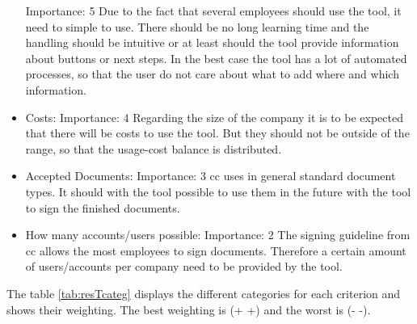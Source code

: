 \begin{itemize}
	Importance: 5 \newline
	Due to the fact that several employees should use the tool, it need to simple to use. There should be no long learning time and the handling should be intuitive or at least should the tool provide information about buttons or next steps. In the best case the tool has a lot of automated processes, so that the user do not care about what to add where and which information.
	\item Costs: \newline
	Importance: 4 \newline
	Regarding the size of the company it is to be expected that there will be costs to use the tool. But they should not be outside of the range, so that the usage-cost balance is distributed.
	\item Accepted Documents: \newline
	Importance: 3 \newline
	\Gls{cc} uses in general standard document types. It should with the tool possible to use them in the future with the tool to sign the finished documents.
	\item How many accounts/users possible: \newline
	Importance: 2 \newline
	The signing guideline from \gls{cc} allows the most employees to sign documents. Therefore a certain amount of users/accounts per company need to be provided by the tool.
\end{itemize}

The table \ref{tab:resTcateg} displays the different categories for each criterion and shows
their weighting. The best weighting is (+ +) and the worst is (- -).

